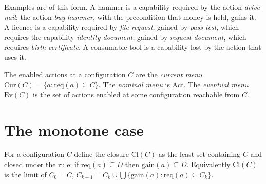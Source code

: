 Examples are of this form. A hammer is a capability required by the action \emph{drive nail}; the action \emph{buy hammer}, with the precondition that money is held, gains it. A licence is a capability required by \emph{file request}, gained by \emph{pass test}, which requires the capability \emph{identity document}, gained by \emph{request document}, which requires \emph{birth certificate}. A consumable tool is a capability lost by the action that uses it.

The enabled actions at a configuration $C$ are the \emph{current menu} $\mathrm{Cur}(C)=\{a:\mathrm{req}(a)\subseteq C\}$. The \emph{nominal menu} is $\mathrm{Act}$. The \emph{eventual menu} $\mathrm{Ev}(C)$ is the set of actions enabled at some configuration reachable from $C$.

\section{The monotone case}

For a configuration $C$ define the closure $\mathrm{Cl}(C)$ as the least set containing $C$ and closed under the rule: if $\mathrm{req}(a)\subseteq D$ then $\mathrm{gain}(a)\subseteq D$. Equivalently $\mathrm{Cl}(C)$ is the limit of $C_0=C$, $C_{k+1}=C_k\cup\bigcup\{\mathrm{gain}(a):\mathrm{req}(a)\subseteq C_k\}$.

